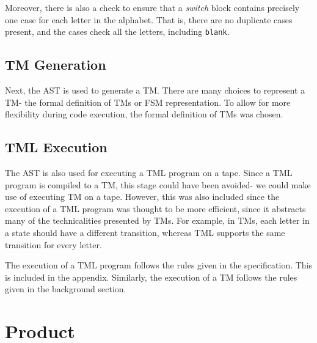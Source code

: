 Moreover, there is also a check to ensure that a \textit{switch} block contains precisely one case for each letter in the alphabet. That is, there are no duplicate cases present, and the cases check all the letters, including \texttt{blank}.




\subsection{TM Generation}
Next, the AST is used to generate a TM. There are many choices to represent a TM- the formal definition of TMs or FSM representation. To allow for more flexibility during code execution, the formal definition of TMs was chosen. 



\subsection{TML Execution}

The AST is also used for executing a TML program on a tape. Since a TML program is compiled to a TM, this stage could have been avoided- we could make use of executing TM on a tape. However, this was also included since the execution of a TML program was thought to be more efficient, since it abstracts many of the technicalities presented by TMs. For example, in TMs, each letter in a state should have a different transition, whereas TML supports the same transition for every letter.

The execution of a TML program follows the rules given in the specification. This is included in the appendix. Similarly, the execution of a TM follows the rules given in the background section.

\section{Product}

